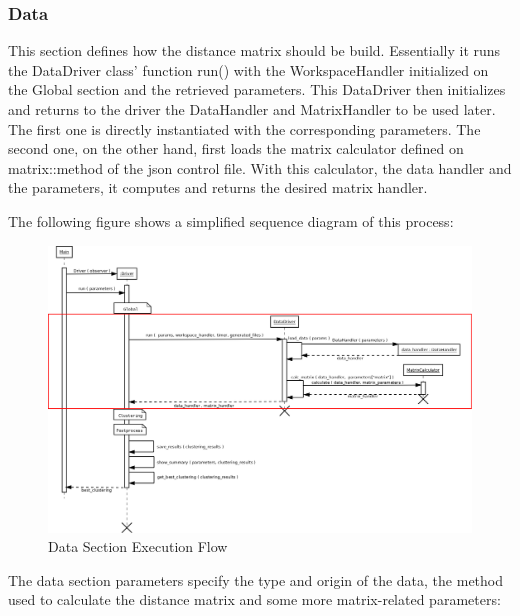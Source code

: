 \subsubsection{Data}

This section defines how the distance matrix should be build. Essentially it runs the DataDriver class' function run() with the WorkspaceHandler initialized on the Global section and the retrieved parameters. This DataDriver then initializes and returns to the driver the DataHandler and MatrixHandler to be used later. The first one is directly instantiated with the corresponding parameters. The second one, on the other hand, first loads the matrix calculator defined on matrix::method of the json control file. With this calculator, the data handler and the parameters, it computes and returns the desired matrix handler. 

The following figure shows a simplified sequence diagram of this process:

\begin{landscape}
\begin{figure}
\includegraphics[width=24cm]{img/data_sequence_driver.png}
\caption{Data Section Execution Flow}
\end{figure}
\end{landscape}



The data section parameters specify the type and origin of the data, the method used to calculate the distance matrix and some more matrix-related parameters:


